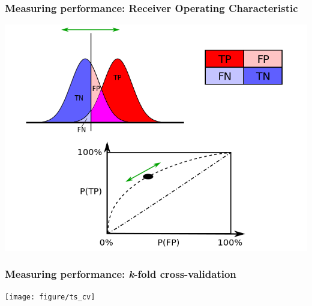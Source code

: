 \documentclass{beamer}
\begin{document}
\begin{frame}
  \frametitle{Measuring performance: Receiver Operating Characteristic}
  
  \begin{center}
    \includegraphics[width=\textwidth,height=0.75\textheight,keepaspectratio=true]{figure/wiki_709px-ROC_curves}
  \end{center}
  
  
\end{frame}


\begin{frame}
  \frametitle{Measuring performance: \textit{k}-fold cross-validation}

  \begin{center}
    \texttt{[image: figure/ts\_cv]}
  \end{center}


\end{frame}
\end{document}
